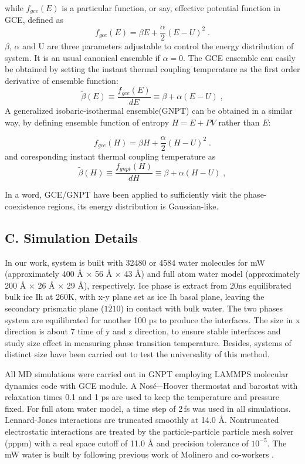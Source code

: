 \documentclass[aps,prl,twocolumn,superscriptaddress]{revtex4-1}
\begin{document}
while $f_{gce}(E)$ is a particular function, or say, effective potential function in GCE, defined as
\begin{equation}
f_{gce}(E)=\beta E+ \frac{\alpha}{2}(E−U)^2\;.
\end{equation}
$\beta$, $\alpha$ and U are three parameters adjustable to control the energy distribution of system. It is an usual canonical ensemble if $\alpha=0$. The GCE ensemble can easily be obtained by setting the instant thermal coupling temperature as the first order derivative of ensemble function:
\begin{equation}
\widetilde{\beta}(E)≡\frac{f_{gce}(E)}{dE}≡\beta+α(E−U)\;,
\end{equation}
A generalized isobaric-isothermal ensemble(GNPT) can be obtained in a similar way, by defining ensemble function of entropy $H=E+PV$ rather than $E$:

\begin{equation}
f_{gce}(H)=\beta H+ \frac{\alpha}{2}(H−U)^2\;.
\end{equation}
and coresponding instant thermal coupling temperature as
\begin{equation}
\widetilde{\beta}(H)≡\frac{f_{gnpt}(H)}{dH}≡\beta+α(H−U)\;,
\end{equation}

In a word, GCE/GNPT have been applied to sufficiently visit the phase-coexistence regions, its energy distribution is Gaussian-like\cite{Xu2012,Xu2015}. 

\subsection{C. Simulation Details}
In our work, system is built with 32480 or 4584 water molecules for mW (approximately 400 Å × 56 Å × 43 Å) and full atom water model (approximately 200 Å × 26 Å × 29 Å), respectively. Ice phase is extract from 20ns equilibrated bulk ice Ih at 260K, with x-y plane set as ice Ih basal plane, leaving the secondary prismatic plane ($1\overline{2}10$) in contact with bulk water. The two phases system are equilibrated for another 100 ps to produce the interfaces. The size in x direction is about 7 time of y and z direction, to ensure stable interfaces and study size effect in measuring phase transition temperature. Besides, systems of distinct size have been carried out to test the universality of this method.

All MD simulations were carried out in GNPT employing LAMMPS molecular dynamics code with GCE module\cite{Xu2012}. A Nosé−Hoover thermostat and barostat\cite{Nose1984,Hoover1985} with  relaxation times 0.1 and 1 ps are used to keep the temperature and pressure fixed. For full atom water model, a time step of 2\,fs  was used in all simulations. Lennard-Jones interactions are truncated smoothly at 14.0 Å. Nontruncated electrostatic interactions are treated by the particle-particle particle mesh solver (pppm) with a real space cutoff of 11.0 Å and precision tolerance of $10^{-5}$.  The mW water is built by following previous work of Molinero and co-workers\cite{Molinero2009} .
\end{document}
